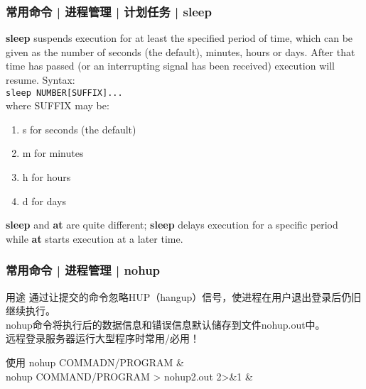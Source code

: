 \begin{frame}[fragile]
  \frametitle{常用命令 | 进程管理 | 计划任务 | sleep}
  \textbf{sleep} suspends execution for at least the specified period of time, which can be given as the number of seconds (the default), minutes, hours or days. After that time has passed (or an interrupting signal has been received) execution will resume. Syntax:\\
  \vspace{0.1cm}
  \verb|sleep NUMBER[SUFFIX]...|\\
  \vspace{0.1cm}
  where SUFFIX may be:
  \begin{enumerate}
    \item s for seconds (the default)
    \item m for minutes
    \item h for hours
    \item d for days
  \end{enumerate}
  \textbf{sleep} and \textbf{at} are quite different; \textbf{sleep} delays execution for a specific period while \textbf{at} starts execution at a later time.
\end{frame}

\begin{frame}
  \frametitle{常用命令 | 进程管理 | \alert{nohup}}
  \begin{block}{用途}
    通过让提交的命令忽略HUP（hangup）信号，使进程在用户退出登录后仍旧继续执行。\\ nohup命令将执行后的数据信息和错误信息默认储存到文件nohup.out中。\\ \alert{远程登录服务器运行大型程序时常用/必用！}
  \end{block}
  \pause
  \begin{block}{使用}
    nohup COMMADN/PROGRAM \& \\
    nohup COMMAND/PROGRAM > nohup2.out 2>\&1 \&
  \end{block}
\end{frame}

